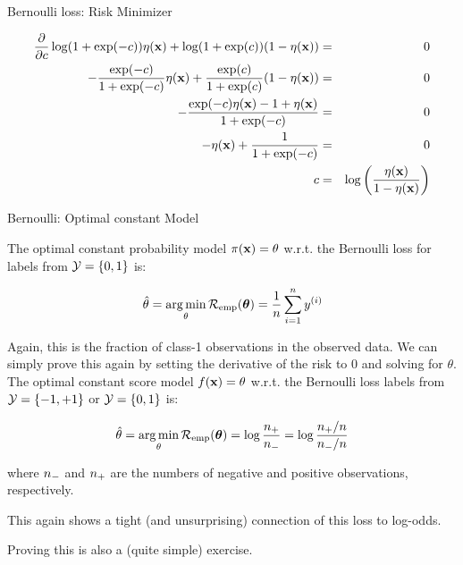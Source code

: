 \documentclass[11pt,compress,t,notes=noshow, xcolor=table]{beamer}
\begin{document}
\begin{vbframe}{Bernoulli loss: Risk Minimizer}
\begin{footnotesize}
  \begin{eqnarray*}
  \frac{\partial }{\partial c} \log(1 + \exp(-c)) \eta(\mathbf{x})+ \log(1 + \exp(c)) (1 - \eta(\mathbf{x})) &=& 0 \\
  - \frac{\exp(-c)}{1 + \exp(-c)} \eta(\mathbf{x}) + \frac{\exp(c)}{1 + \exp(c)} (1 - \eta(\mathbf{x})) &=& 0 \\ 
  - \frac{\exp(-c) \eta(\mathbf{x}) - 1 + \eta(\mathbf{x})}{1 + \exp(-c)} &=& 0 \\
  - \eta(\mathbf{x}) + \frac{1}{1 + \exp(-c)} &=& 0\\
   c &=& \log\left(\frac{\eta(\mathbf{x})}{1 - \eta(\mathbf{x})}\right)
  \end{eqnarray*}
\end{footnotesize}

\end{vbframe}



\begin{vbframe}{Bernoulli: Optimal constant Model}

{\small The optimal constant probability model $\pi(\mathbf{x}) = \theta$ w.r.t. the Bernoulli loss for labels from $\mathcal{Y} = \{0, 1\}$ is:

\begin{eqnarray*}
  \hat{\theta} = \operatorname*{arg\,min}_{\theta} \mathcal{R}_{\text{emp}}(\bm{\theta}) = \frac{1}{n} \sum\limits_{i=1}^n y^{(i)}
\end{eqnarray*}

Again, this is the fraction of class-1 observations in the observed data.
We can simply prove this again by setting the derivative of the risk to 0 and solving for $\theta$. The optimal constant score model $f(\mathbf{x}) = \theta$ w.r.t. the Bernoulli loss labels from $\mathcal{Y} = \{-1, +1\}$ or $\mathcal{Y} = \{0, 1\}$ is:

\begin{eqnarray*}
  \hat{\theta} = \operatorname*{arg\,min}_{\theta} \mathcal{R}_{\text{emp}}(\bm{\theta}) = \log \frac{n_{+}}{n_{-}} = \log \frac{n_{+} / n}{n_{-} /n} 
\end{eqnarray*}

where $n_{-}$ and $n_{+}$ are the numbers of negative and positive observations, respectively.

This again shows a tight (and unsurprising) connection of this loss to log-odds.

Proving this is also a (quite simple) exercise.
}

\end{vbframe}
\end{document}
